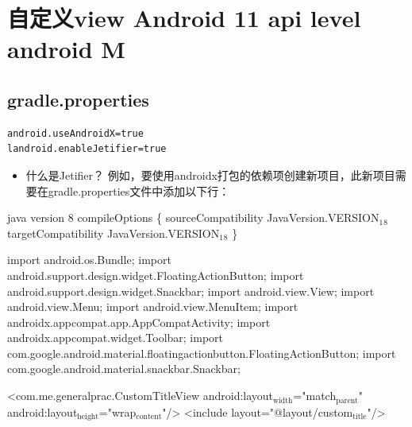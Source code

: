 \documentclass[9pt, b5paper]{article}
\begin{document}
\section{自定义view Android 11 api level android M}
\label{sec-19}
\subsection{gradle.properties}
\label{sec-19-1}
\begin{verbatim}
android.useAndroidX=true
landroid.enableJetifier=true
\end{verbatim}
\begin{itemize}
\item 什么是Jetifier？ 例如，要使用androidx打包的依赖项创建新项目，此新项目需要在gradle.properties文件中添加以下行：
\end{itemize}

java version 8
 compileOptions \{
        sourceCompatibility JavaVersion.VERSION$_{\text{1}}$$_{\text{8}}$
        targetCompatibility JavaVersion.VERSION$_{\text{1}}$$_{\text{8}}$
    \}

import android.os.Bundle;
import android.support.design.widget.FloatingActionButton;
import android.support.design.widget.Snackbar;
import android.view.View;
import android.view.Menu;
import android.view.MenuItem;
import androidx.appcompat.app.AppCompatActivity;
import androidx.appcompat.widget.Toolbar;
import com.google.android.material.floatingactionbutton.FloatingActionButton;
import com.google.android.material.snackbar.Snackbar;

<com.me.generalprac.CustomTitleView
    android:layout$_{\text{width}}$="match$_{\text{parent}}$"
    android:layout$_{\text{height}}$="wrap$_{\text{content}}$"/>
<include layout="@layout/custom$_{\text{title}}$"/>
\end{document}
